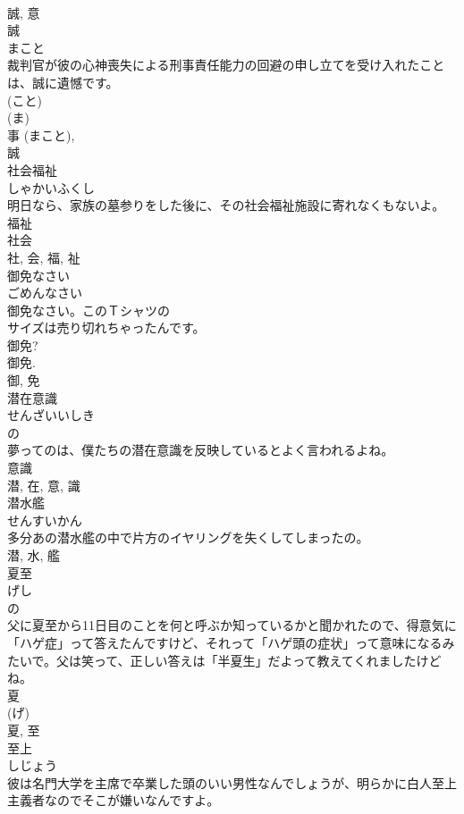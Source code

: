 \documentclass[8pt]{extreport}
\begin{document}
\begin{CJK}{UTF8}{min}
\\	誠, 意	
\\	誠	
\\	まこと	
\\	裁判官が彼の心神喪失による刑事責任能力の回避の申し立てを受け入れたことは、誠に遺憾です。	
\\	(こと) 
\\	(ま) 
\\	事 (まこと), 
\\	誠	
\\	社会福祉	
\\	しゃかいふくし	
\\	明日なら、家族の墓参りをした後に、その社会福祉施設に寄れなくもないよ。	
\\	福祉 
\\	社会 
\\	社, 会, 福, 祉	
\\	御免なさい	
\\	ごめんなさい	
\\	御免なさい。このＴシャツの
\\	サイズは売り切れちゃったんです。	
\\	御免? 
\\	御免. 
\\	御, 免	
\\	潜在意識	
\\	せんざいいしき	
\\	の 
\\	夢ってのは、僕たちの潜在意識を反映しているとよく言われるよね。	
\\	意識 
\\	潜, 在, 意, 識	
\\	潜水艦	
\\	せんすいかん	
\\	多分あの潜水艦の中で片方のイヤリングを失くしてしまったの。	
\\	潜, 水, 艦	
\\	夏至	
\\	げし	
\\	の 
\\	父に夏至から11日目のことを何と呼ぶか知っているかと聞かれたので、得意気に「ハゲ症」って答えたんですけど、それって「ハゲ頭の症状」って意味になるみたいで。父は笑って、正しい答えは「半夏生」だよって教えてくれましたけどね。	
\\	夏 
\\	(げ) 
\\	夏, 至	
\\	至上	
\\	しじょう	
\\	彼は名門大学を主席で卒業した頭のいい男性なんでしょうが、明らかに白人至上主義者なのでそこが嫌いなんですよ。	

\end{CJK}
\end{document}
